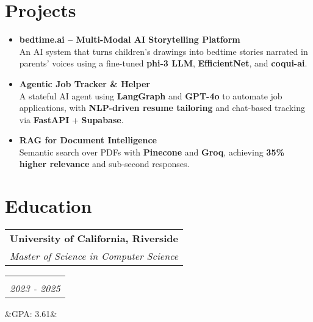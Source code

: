 \documentclass[11pt,a4paper,sans]{moderncv}
\makeatletter
\newcommand*{\customcventry}[7][.13em]{
\begin{tabular}{@{}l}
{\bfseries #4} \\
{\itshape #3}
\end{tabular}
\hfill
\begin{tabular}{l@{}}
{\bfseries #5} \\
{\itshape #2}
\end{tabular}
\ifx&#7&%
\else{%
\begin{minipage}{\maincolumnwidth}%
\small#7%
\end{minipage}}\fi%
\par\addvspace{#1}}
\makeatother
\begin{document}
\section{Projects}
\begin{itemize}[leftmargin=0.6cm, label={\textbullet}]
    \item \textbf{bedtime.ai – Multi-Modal AI Storytelling Platform} \\
    An AI system that turns children’s drawings into bedtime stories narrated in parents’ voices using a fine-tuned \textbf{phi-3 LLM}, \textbf{EfficientNet}, and \textbf{coqui-ai}. 
        
    \item \textbf{Agentic Job Tracker \& Helper} \\
    A stateful AI agent using \textbf{LangGraph} and \textbf{GPT-4o} to automate job applications, with \textbf{NLP-driven resume tailoring} and chat-based tracking via \textbf{FastAPI} + \textbf{Supabase}.
    
    \item \textbf{RAG for Document Intelligence} \\
    Semantic search over PDFs with \textbf{Pinecone} and \textbf{Groq}, achieving \textbf{35\% higher relevance} and sub-second responses.

\end{itemize}



\section{Education}
\customcventry{2023 - 2025}{Master of Science in Computer Science}{University of California, Riverside}{}{}{GPA: 3.61}
\end{document}

